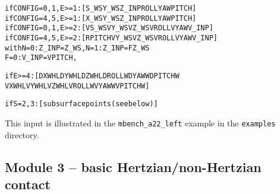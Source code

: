 \documentclass[12pt]{report}
\renewcommand{\magenta}[1]{}
\begin{document}
\begin{alltt}
if CONFIG=0,1, E>=1: [ S\_WS    Y\_WS    Z\_INP  ROLL    YAW    PITCH    ]
if CONFIG=4,5, E>=1: [ X\_WS    Y\_WS    Z\_INP  ROLL    YAW    PITCH    ]
if CONFIG=0,1, E>=2: [ VS\_WS   VY\_WS   VZ\_WS  VROLL   VYAW   V\_INP    ]
if CONFIG=4,5, E>=2: [ RPITCH  VY\_WS   VZ\_WS  VROLL   VYAW   V\_INP    ]
   with  N=0:\magenta{  } Z\_INP = Z\_WS,   N=1: Z\_INP = FZ\_WS
         F=0\magenta{,3}: V\_INP = VPITCH, \magenta{F=1: V\_INP = FX\_WS, F=2: V\_INP = MY\_WS}

% Information on flexible wheelset deviations (section \ref{sec:wheelset_geom}):

if E>=4:    [ DXWHL    DYWHL    DZWHL    DROLLW   DYAWW    DPITCHW 
              VXWHL    VYWHL    VZWHL    VROLLW   VYAWW    VPITCHW    ]

% Subsurface stress calculation (section \ref{sec:subsurf}):

if S=2,3: [ subsurface points (see below) ]
\end{alltt}
This input is illustrated in the {\tt mbench\_a22\_left} example in the
{\tt examples} directory.

\color{black}


\subsection{Module 3 -- basic Hertzian/non-Hertzian contact}
\end{document}

